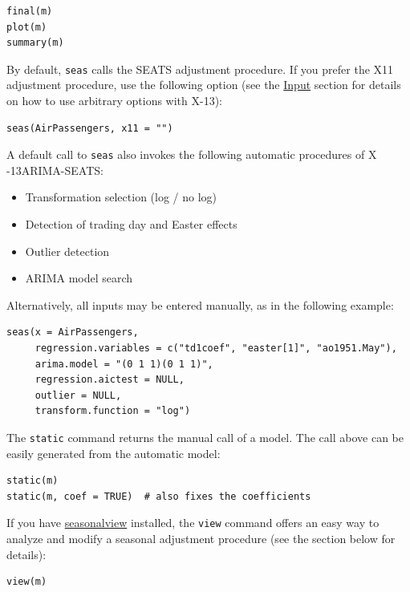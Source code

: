 \begin{verbatim}
final(m)
plot(m)
summary(m)
\end{verbatim}

By default, \texttt{seas} calls the SEATS adjustment procedure. If you
prefer the X11 adjustment procedure, use the following option (see the
\hyperref[input]{Input} section for details on how to use arbitrary
options with X-13):

\begin{verbatim}
seas(AirPassengers, x11 = "")
\end{verbatim}

A default call to \texttt{seas} also invokes the following automatic
procedures of X -13ARIMA-SEATS:

\begin{itemize}
\itemsep1pt\parskip0pt
\item
  Transformation selection (log / no log)
\item
  Detection of trading day and Easter effects
\item
  Outlier detection
\item
  ARIMA model search
\end{itemize}

Alternatively, all inputs may be entered manually, as in the following
example:

\begin{verbatim}
seas(x = AirPassengers, 
     regression.variables = c("td1coef", "easter[1]", "ao1951.May"), 
     arima.model = "(0 1 1)(0 1 1)", 
     regression.aictest = NULL,
     outlier = NULL, 
     transform.function = "log")
\end{verbatim}

The \texttt{static} command returns the manual call of a model. The call
above can be easily generated from the automatic model:

\begin{verbatim}
static(m)
static(m, coef = TRUE)  # also fixes the coefficients
\end{verbatim}

If you have
\href{https://cran.r-project.org/package=seasonalview}{seasonalview}
installed, the \texttt{view} command offers an easy way to analyze and
modify a seasonal adjustment procedure (see the section below for
details):

\begin{verbatim}
view(m)
\end{verbatim}


